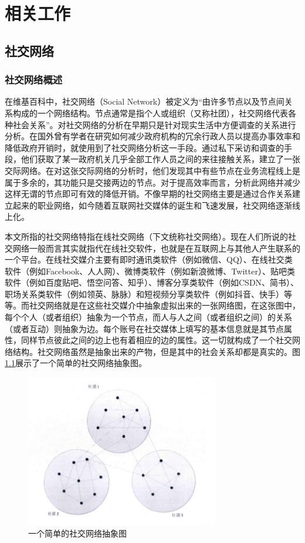 \chapter{相关工作}
\section{社交网络}
\subsection{社交网络概述}
在维基百科中，社交网络（Social Network）被定义为“由许多节点以及节点间关系构成的一个网络结构。节点通常是指个人或组织（又称社团），社交网络代表各种社会关系”。对社交网络的分析在早期只是针对现实生活中方便调查的关系进行分析。在国外曾有学者在研究如何减少政府机构的冗余行政人员以提高办事效率和降低政府开销时，就使用到了社交网络分析这一手段。通过私下采访和调查的手段，他们获取了某一政府机关几乎全部工作人员之间的来往接触关系，建立了一张交际网络。在对这张交际网络的分析时，他们发现其中有些节点在业务流程线上是属于多余的，其功能只是交接两边的节点。对于提高效率而言，分析此网络并减少这样无谓的节点即可有效的降低开销。不像早期的社交网络主要是通过合作关系建立起来的职业网络，如今随着互联网社交媒体的诞生和飞速发展，社交网络逐渐线上化。

本文所指的社交网络特指在线社交网络（下文统称社交网络）。现在人们所说的社交网络一般而言其实就指代在线社交软件，也就是在互联网上与其他人产生联系的一个平台。在线社交媒介主要有即时通讯类软件（例如微信、QQ）、在线社交类软件（例如Facebook、人人网）、微博类软件（例如新浪微博、Twitter）、贴吧类软件（例如百度贴吧、悟空问答、知乎）、博客分享类软件（例如CSDN、简书）、职场关系类软件（例如领英、脉脉）和短视频分享类软件（例如抖音、快手）等等。而社交网络就是在这些社交媒介中抽象虚拟出来的一张网络图，在这张图中，每个个人（或者组织）抽象为一个节点，而人与人之间（或者组织之间）的关系（或者互动）则抽象为边。每个账号在社交媒体上填写的基本信息就是其节点属性，同样节点彼此之间的边上也有着相应的边的属性。这一切就构成了一个社交网络结构。社交网络虽然是抽象出来的产物，但是其中的社会关系却都是真实的。图\ref{fig:fig2-1}展示了一个简单的社交网络抽象图。

\begin{figure}
  \centering
  \includegraphics[width=0.75\textwidth]{figures/fig2-1}
  \caption{一个简单的社交网络抽象图}\label{fig:fig2-1}
\end{figure}

